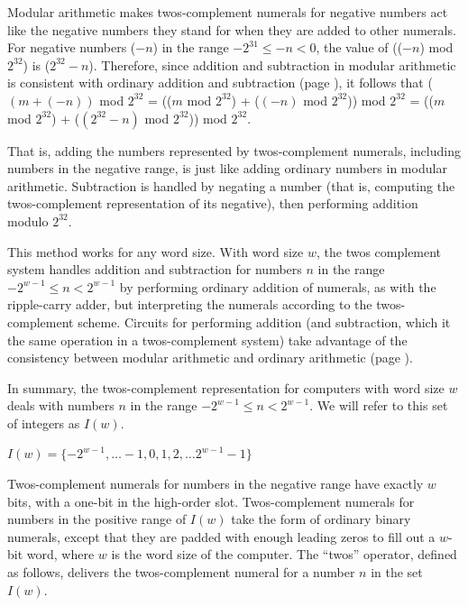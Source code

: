 Modular arithmetic makes twos-complement numerals
for negative numbers act like the negative numbers they stand for
when they are added to other numerals.
For negative numbers ($-n$) in the range $-2^{31} \le -n < 0$,
the value of (($-n$) mod $2^{32}$) is ($2^{32}-n$).
Therefore, since addition and subtraction
in modular arithmetic is consistent with ordinary addition and subtraction
(page \pageref{modular-arithmetic}), it follows that
  ($(m+(-n))$ mod $2^{32}$
= (($m$ mod $2^{32}$) + ($(-n)$ mod $2^{32}$)) mod $2^{32}$
= (($m$ mod $2^{32}$) + ($(2^{32} - n)$ mod $2^{32}$)) mod $2^{32}$.

That is, adding the numbers represented by twos-complement
numerals, including numbers in the negative range,
is just like adding ordinary numbers in modular arithmetic.
Subtraction is handled by negating a number
(that is, computing the twos-complement representation
of its negative), then performing addition modulo $2^{32}$.

This method works for any word size.
With word size $w$, the twos complement system
handles addition and subtraction for numbers $n$
in the range $-2^{w-1} \leq n < 2^{w-1}$
by performing ordinary addition of numerals,
as with the ripple-carry adder, but interpreting
the numerals according to the twos-complement scheme.
Circuits for performing addition (and subtraction, which
it the same operation in a twos-complement system)
take advantage of the consistency between modular arithmetic
and ordinary arithmetic (page \pageref{modular-arithmetic}).

In summary, the twos-complement representation for computers with
word size $w$ deals with numbers $n$ in the range
$-2^{w-1} \leq n < 2^{w-1}$.
We will refer to this set of integers as $I(w)$.
\label{def-Iw}
\begin{center}
$I(w) = \{-2^{w-1}, \dots -1, 0, 1, 2, \dots 2^{w-1}-1\}$
\end{center}

Twos-complement numerals for numbers in the negative range
have exactly $w$ bits, with a one-bit in the high-order slot.
Twos-complement numerals for numbers in the positive range of $I(w)$
take the form of ordinary binary numerals, except that
they are padded with enough leading zeros
to fill out a $w$-bit word, where $w$ is the word size of the computer.
The ``twos'' operator, defined as follows, delivers the twos-complement numeral
for a number $n$ in the set $I(w)$.

